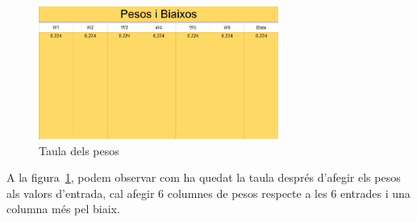 \begin{figure}[h!]
    \centering
    \includegraphics[width=0.7\textwidth]{./figures/Pesos.png}
    \caption{Taula dels pesos}
    \label{f:pesos}
\end{figure}

A la figura~\ref{f:pesos}, podem observar com ha quedat la taula després d'afegir els pesos als valors d'entrada, cal afegir 6 columnes de pesos respecte a les 6 entrades i una columna més pel biaix.

